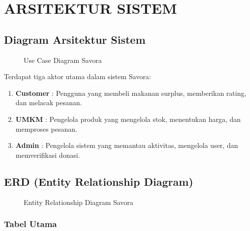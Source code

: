 \section{ARSITEKTUR SISTEM}

\subsection{Diagram Arsitektur Sistem}

\begin{figure}[H]
\centering
\caption{Use Case Diagram Savora}
\label{fig:usecase}
\end{figure}

Terdapat tiga aktor utama dalam sistem Savora:
\begin{enumerate}[leftmargin=*]
    \item \textbf{Customer} : Pengguna yang membeli makanan surplus, memberikan rating, dan melacak pesanan.
    \item \textbf{UMKM} : Pengelola produk yang mengelola stok, menentukan harga, dan memproses pesanan.
    \item \textbf{Admin} : Pengelola sistem yang memantau aktivitas, mengelola user, dan memverifikasi donasi.
\end{enumerate}

\subsection{ERD (Entity Relationship Diagram)}

\begin{figure}[H]
\centering
\caption{Entity Relationship Diagram Savora}
\label{fig:erd}
\end{figure}

\subsubsection{Tabel Utama}

